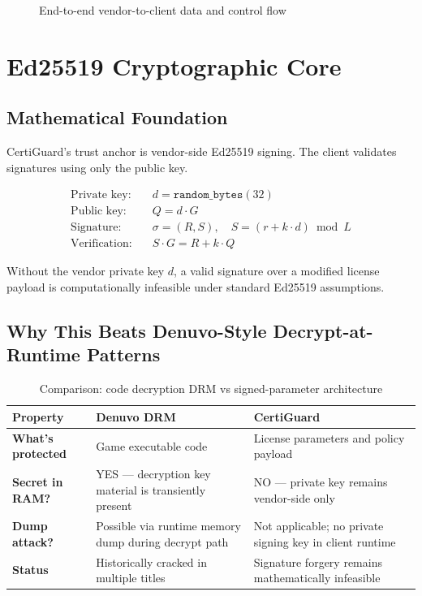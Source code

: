 \documentclass[11pt,a4paper]{article}
\begin{document}
\begin{figure}[H]
\caption{End-to-end vendor-to-client data and control flow}
\end{figure}

\section{Ed25519 Cryptographic Core}

\subsection{Mathematical Foundation}
CertiGuard's trust anchor is vendor-side Ed25519 signing. The client validates signatures using only the public key.

\begin{align*}
\text{Private key:}\quad & d = \texttt{random\_bytes}(32) \\
\text{Public key:}\quad & Q = d \cdot G \\
\text{Signature:}\quad & \sigma = (R,S), \quad S = (r + k\cdot d)\bmod L \\
\text{Verification:}\quad & S\cdot G = R + k\cdot Q
\end{align*}

\begin{tcolorbox}[certicallout,title=\textbf{Security Implication}]
Without the vendor private key $d$, a valid signature over a modified license payload is computationally infeasible under standard Ed25519 assumptions.
\end{tcolorbox}

\subsection{Why This Beats Denuvo-Style Decrypt-at-Runtime Patterns}
\begin{table}[H]
\centering
\caption{Comparison: code decryption DRM vs signed-parameter architecture}
\begin{tabularx}{\textwidth}{>{\bfseries}lYY}
\toprule
Property & Denuvo DRM & CertiGuard \\
\midrule
What's protected & Game executable code & License parameters and policy payload \\
Secret in RAM? & YES --- decryption key material is transiently present & NO --- private key remains vendor-side only \\
Dump attack? & Possible via runtime memory dump during decrypt path & Not applicable; no private signing key in client runtime \\
Status & Historically cracked in multiple titles & Signature forgery remains mathematically infeasible \\
\bottomrule
\end{tabularx}
\end{table}
\end{document}
